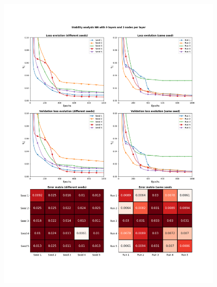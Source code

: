 \documentclass[]{article}
\begin{document}
\thispagestyle{empty}
\begin{figure}
	\centering
	\includegraphics[height=\textheight, width=\textwidth]{"3nodes"}
\end{figure}
\newpage
\end{document}
